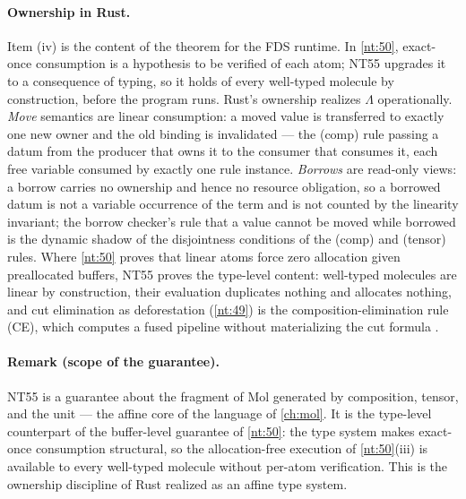 \paragraph{Ownership in Rust.}
Item (iv) is the content of the theorem for the FDS runtime. In \autoref{nt:50}, exact-once consumption is a hypothesis to be verified of each atom; NT55 upgrades it to a consequence of typing, so it holds of every well-typed molecule by construction, before the program runs. Rust's ownership realizes $\Lambda$ operationally. \emph{Move} semantics are linear consumption: a moved value is transferred to exactly one new owner and the old binding is invalidated --- the (comp) rule passing a datum from the producer that owns it to the consumer that consumes it, each free variable consumed by exactly one rule instance. \emph{Borrows} are read-only views: a borrow carries no ownership and hence no resource obligation, so a borrowed datum is not a variable occurrence of the term and is not counted by the linearity invariant; the borrow checker's rule that a value cannot be moved while borrowed is the dynamic shadow of the disjointness conditions of the (comp) and (tensor) rules. Where \autoref{nt:50} proves that linear atoms force zero allocation given preallocated buffers, NT55 proves the type-level content: well-typed molecules are linear by construction, their evaluation duplicates nothing and allocates nothing, and cut elimination as deforestation (\autoref{nt:49}) is the composition-elimination rule (CE), which computes a fused pipeline without materializing the cut formula \citep{wadler}.

\paragraph{Remark (scope of the guarantee).}
NT55 is a guarantee about the fragment of Mol generated by composition, tensor, and the unit --- the affine core of the language of \autoref{ch:mol}. It is the type-level counterpart of the buffer-level guarantee of \autoref{nt:50}: the type system makes exact-once consumption structural, so the allocation-free execution of \autoref{nt:50}(iii) is available to every well-typed molecule without per-atom verification. This is the ownership discipline of Rust realized as an affine type system.
